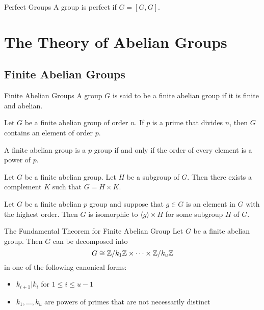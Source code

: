 \documentclass[a4paper]{article}
\begin{document}
\begin{defn}{Perfect Groups}{} A group is perfect if $G=[G,G]$. 
\end{defn}


\pagebreak
\section{The Theory of Abelian Groups}
\subsection{Finite Abelian Groups}
\begin{defn}{Finite Abelian Groups}{} A group $G$ is said to be a finite abelian group if it is finite and abelian. 
\end{defn}

\begin{lmm}{}{} Let $G$ be a finite abelian group of order $n$. If $p$ is a prime that divides $n$, then $G$ contains an element of order $p$. 
\end{lmm}

\begin{lmm}{}{} A finite abelian group is a $p$ group if and only if the order of every element is a power of $p$. 
\end{lmm}

\begin{lmm}{}{} Let $G$ be a finite abelian group. Let $H$ be a subgroup of $G$. Then there exists a complement $K$ such that $G=H\times K$. 
\end{lmm}

\begin{lmm}{}{} Let $G$ be a finite abelian $p$ group and suppose that $g\in G$ is an element in $G$ with the highest order. Then $G$ is isomorphic to $\langle g\rangle\times H$ for some subgroup $H$ of $G$. 
\end{lmm}

\begin{thm}{The Fundamental Theorem for Finite Abelian Group}{} Let $G$ be a finite abelian group. Then $G$ can be decomposed into $$G\cong\mathbb{Z}/k_1\mathbb{Z}\times\dots\times\mathbb{Z}/k_u\mathbb{Z}$$ in one of the following canonical forms: 
\begin{itemize}
\item $k_{i+1}|k_i$ for $1\leq i\leq u-1$
\item $k_1,\dots,k_u$ are powers of primes that are not necessarily distinct
\end{itemize}
\end{thm}
\end{document}
